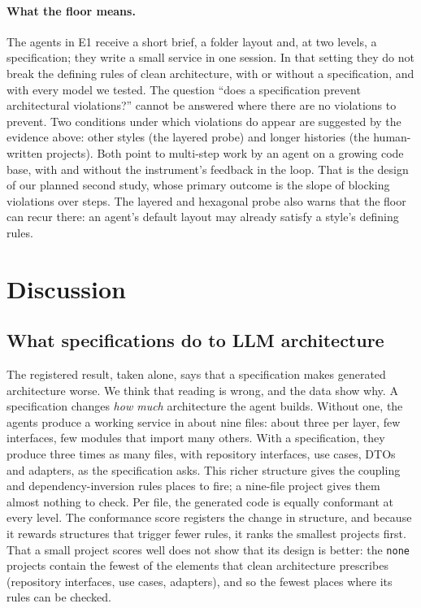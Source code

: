 \documentclass[10pt,a4paper]{article}
\newcommand{\lev}[1]{\texttt{\small #1}}
\begin{document}
\paragraph{What the floor means.} The agents in E1 receive a short brief, a folder layout and, at two levels, a
specification; they write a small service in one session. In that setting they do not break the defining rules of
clean architecture, with or without a specification, and with every model we tested. The question ``does a
specification prevent architectural violations?'' cannot be answered where there are no violations to prevent. Two
conditions under which violations do appear are suggested by the evidence above: other styles (the layered probe)
and longer histories (the human-written projects). Both point to multi-step work by an agent on a growing code base,
with and without the instrument's feedback in the loop. That is the design of our planned second study, whose primary
outcome is the slope of blocking violations over steps. The layered and hexagonal probe also warns that the floor can
recur there: an agent's default layout may already satisfy a style's defining rules.

\section{Discussion}\label{sec:discussion}

\subsection{What specifications do to LLM architecture}

The registered result, taken alone, says that a specification makes generated architecture worse. We think that
reading is wrong, and the data show why. A specification changes \emph{how much} architecture the agent builds.
Without one, the agents produce a working service in about nine files: about three per layer, few interfaces,
few modules that import many others. With a specification, they produce three times as many files, with repository
interfaces, use cases, DTOs and adapters, as the specification asks. This richer structure gives the coupling and
dependency-inversion rules places to fire; a nine-file project gives them almost nothing to check. Per file, the
generated code is equally conformant at every level. The conformance score registers the change in structure, and
because it rewards structures that trigger fewer rules, it ranks the smallest projects first. That a small project
scores well does not show that its design is better: the \lev{none} projects contain the fewest of the elements that
clean architecture prescribes (repository interfaces, use cases, adapters), and so the fewest places where its rules
can be checked.
\end{document}
